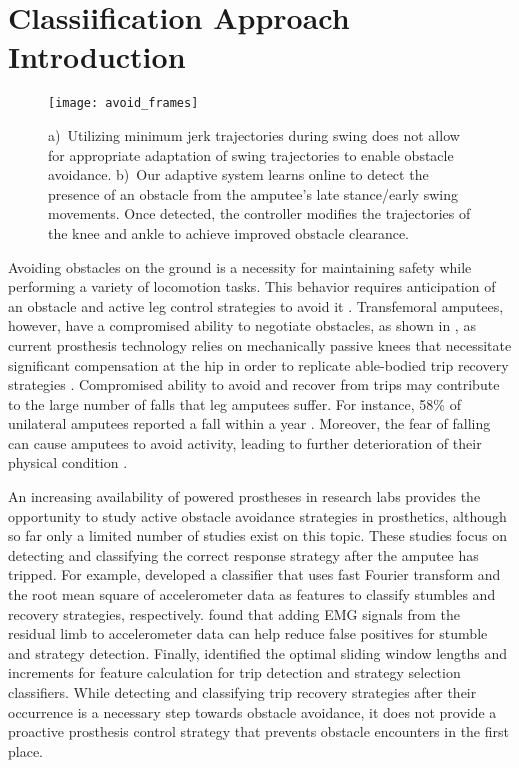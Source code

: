 \section{Classiification Approach Introduction}

\begin{figure*}[t]
\centering
\texttt{[image: avoid\_frames]}
\caption{a)~Utilizing minimum jerk trajectories during swing does not allow for
appropriate adaptation of swing trajectories to enable obstacle avoidance.
b)~Our adaptive system learns online to detect the presence of an obstacle from
the amputee's late stance/early swing movements. Once detected, the controller
modifies the trajectories of the knee and ankle to achieve improved obstacle
clearance.}
\label{fig:avoid_frames}
\end{figure*}

Avoiding obstacles on the ground is a necessity for maintaining safety while
performing a variety of locomotion tasks. This behavior requires anticipation of
an obstacle and active leg control strategies to avoid it \citep{patla1995role}.
Transfemoral amputees, however, have a compromised ability to negotiate
obstacles, as shown in , as current prosthesis technology
relies on mechanically passive knees that necessitate significant compensation
at the hip in order to replicate able-bodied trip recovery strategies
\citep{shirota2015transfemoral}. Compromised ability to avoid and recover from
trips may contribute to the large number of falls that leg amputees suffer. For
instance, 58\% of unilateral amputees reported a fall within a year
\citep{kulkarni1996falls}. Moreover, the fear of falling can cause amputees to
avoid activity, leading to further deterioration of their physical condition
\citep{miller2001prevalence}.

An increasing availability of powered prostheses in research labs provides the
opportunity to study active obstacle avoidance strategies in prosthetics,
although so far only a limited number of studies exist on this topic. These
studies focus on detecting and classifying the correct response strategy after
the amputee has tripped. For example, \citet{lawson2010stumble} developed a
classifier that uses fast Fourier transform and the root mean square of
accelerometer data as features to classify stumbles and recovery strategies,
respectively. \citet{zhang2011towards} found that adding EMG signals from the
residual limb to accelerometer data can help reduce false positives for stumble
and strategy detection. Finally, \citet{shirota2014recovery} identified the
optimal sliding window lengths and increments for feature calculation for trip
detection and strategy selection classifiers. While detecting and classifying
trip recovery strategies after their occurrence is a necessary step towards
obstacle avoidance, it does not provide a proactive prosthesis control strategy
that prevents obstacle encounters in the first place.

